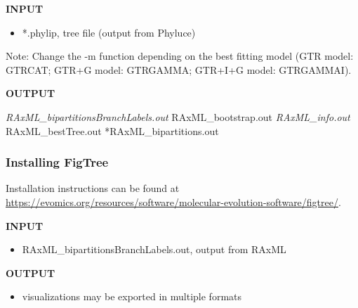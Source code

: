 \documentclass[
  12pt,
]{article}
\newenvironment{Shaded}{\begin{snugshade}}{\end{snugshade}}
\newcommand{\AttributeTok}[1]{\textcolor[rgb]{0.13,0.29,0.53}{#1}}
\newcommand{\CommentTok}[1]{\textcolor[rgb]{0.56,0.35,0.01}{\textit{#1}}}
\newcommand{\ExtensionTok}[1]{#1}
\newcommand{\NormalTok}[1]{#1}
\newcommand{\VariableTok}[1]{\textcolor[rgb]{0.00,0.00,0.00}{#1}}
\providecommand{\tightlist}{%
  \setlength{\itemsep}{0pt}\setlength{\parskip}{0pt}}
\begin{document}
\textbf{INPUT}

\begin{itemize}
\tightlist
\item
  *.phylip, tree file (output from Phyluce)
\end{itemize}

Note: Change the -m function depending on the best fitting model (GTR model: GTRCAT; GTR+G model: GTRGAMMA; GTR+I+G model: GTRGAMMAI).

\begin{Shaded}
\end{Shaded}

\textbf{OUTPUT}

\emph{RAxML\_bipartitionsBranchLabels.out
}RAxML\_bootstrap.out
\emph{RAxML\_info.out
}RAxML\_bestTree.out
*RAxML\_bipartitions.out

\hypertarget{installing-figtree}{%
\subsubsection{Installing FigTree}\label{installing-figtree}}

Installation instructions can be found at \url{https://evomics.org/resources/software/molecular-evolution-software/figtree/}.

\textbf{INPUT}

\begin{itemize}
\tightlist
\item
  RAxML\_bipartitionsBranchLabels.out, output from RAxML
\end{itemize}

\textbf{OUTPUT}

\begin{itemize}
\tightlist
\item
  visualizations may be exported in multiple formats
\end{itemize}
\end{document}
